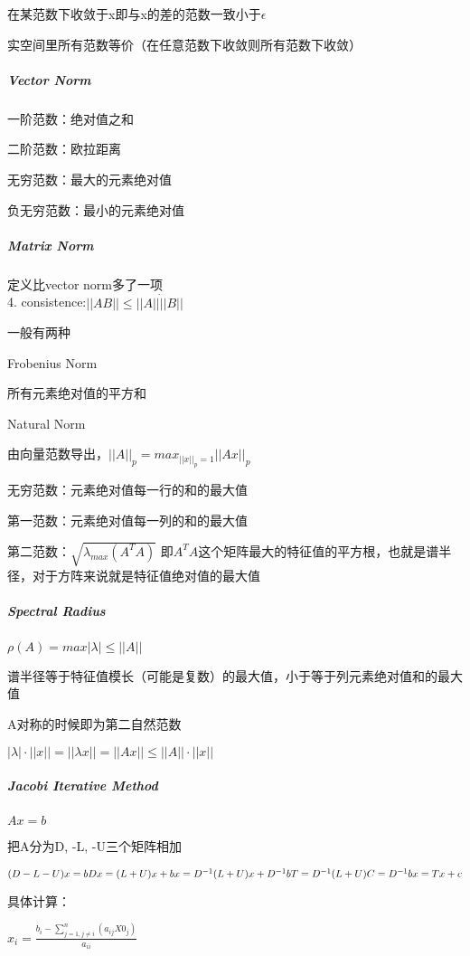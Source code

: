 \documentclass[]{article}
\let\oldsubparagraph\subparagraph
\renewcommand{\subparagraph}[1]{\oldsubparagraph{#1}\mbox{}}
\begin{document}
\begin{multicols}{3}
在某范数下收敛于x即与x的差的范数一致小于\(\epsilon\)

实空间里所有范数等价（在任意范数下收敛则所有范数下收敛）

\subparagraph{Vector Norm}\label{header-c160}

一阶范数：绝对值之和

二阶范数：欧拉距离

无穷范数：最大的元素绝对值

负无穷范数：最小的元素绝对值

\subparagraph{Matrix Norm}\label{header-c171}

定义比vector norm多了一项\\
4. consistence:\(||A B|| \leq ||A||\dot||B|| \)

一般有两种

Frobenius Norm

所有元素绝对值的平方和

Natural Norm

由向量范数导出，\(||A||_p=max_{||x||_p=1} ||Ax||_p\)

无穷范数：元素绝对值每一行的和的最大值

第一范数：元素绝对值每一列的和的最大值

第二范数：\(\sqrt{\lambda_{max}(A^TA)}\)
即\(A^TA\)这个矩阵最大的特征值的平方根，也就是谱半径，对于方阵来说就是特征值绝对值的最大值

\subparagraph{Spectral Radius}\label{header-c188}

\(\rho(A) = max|\lambda| \leq ||A||\)

谱半径等于特征值模长（可能是复数）的最大值，小于等于列元素绝对值和的最大值

A对称的时候即为第二自然范数

\(|\lambda|\cdot||x|| = ||\lambda x|| = ||Ax|| \leq ||A||\cdot ||x||\)

\subparagraph{Jacobi Iterative Method}\label{header-c199}

\(Ax = b\)

把A分为D, -L, -U三个矩阵相加

\((D-L-U)x = b\\
Dx = (L +U)x + b \\
x = D^{-1}(L + U) x + D^{-1}b \\
T = D^{-1}(L + U) \\
C = D^{-1}b\\
x = Tx + c\\\)

具体计算：

\(x_i = \frac{b_i - \sum_{j=1,j\neq i}^n{(a_{ij}X0_j)}}{a_{ii}}\)


\end{multicols}
\end{document}
